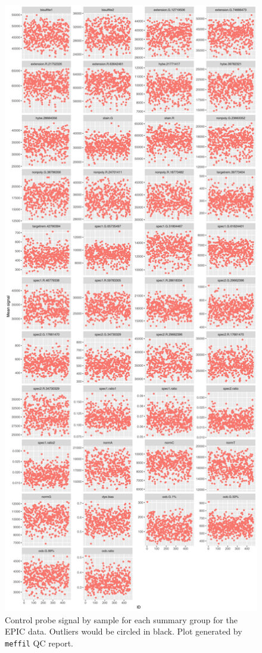 \documentclass[
]{book}
\begin{document}
\begin{figure}

{\centering \includegraphics[width=0.8\linewidth]{figs/SWSqcEPICctrlProbes} 

}

\caption{Control probe signal by sample for each summary group for the EPIC data. Outliers would be circled in black. Plot generated by \texttt{meffil} QC report.}\label{fig:SWSqcEPICctrlProbes}
\end{figure}
\end{document}
